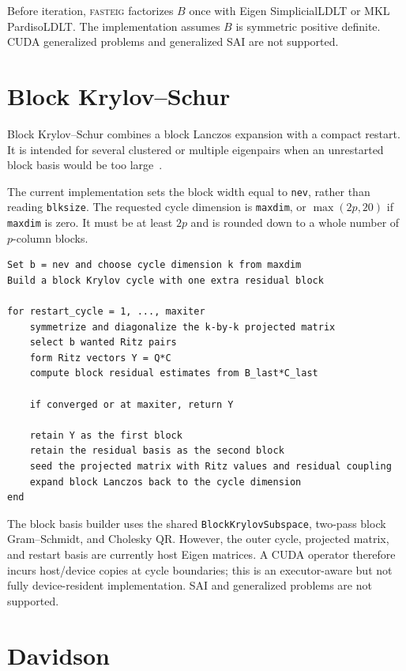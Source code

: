 \documentclass[11pt]{article}
\newcommand{\fasteig}{\textsc{fasteig}}
\newcommand{\code}[1]{\texttt{#1}}
\begin{document}
Before iteration, \fasteig{} factorizes $B$ once with Eigen SimplicialLDLT or
MKL PardisoLDLT.  The implementation assumes $B$ is symmetric positive
definite.  CUDA generalized problems and generalized SAI are not supported.

\section{Block Krylov--Schur}
\label{sec:block-krylov-schur}

Block Krylov--Schur combines a block Lanczos expansion with a compact restart.
It is intended for several clustered or multiple eigenpairs when an unrestarted
block basis would be too large~\cite{blockkrylovschur}.

The current implementation sets the block width equal to \code{nev}, rather
than reading \code{blksize}.  The requested cycle dimension is \code{maxdim},
or $\max(2p,20)$ if \code{maxdim} is zero.  It must be at least $2p$ and is
rounded down to a whole number of $p$-column blocks.

\begin{lstlisting}
Set b = nev and choose cycle dimension k from maxdim
Build a block Krylov cycle with one extra residual block

for restart_cycle = 1, ..., maxiter
    symmetrize and diagonalize the k-by-k projected matrix
    select b wanted Ritz pairs
    form Ritz vectors Y = Q*C
    compute block residual estimates from B_last*C_last

    if converged or at maxiter, return Y

    retain Y as the first block
    retain the residual basis as the second block
    seed the projected matrix with Ritz values and residual coupling
    expand block Lanczos back to the cycle dimension
end
\end{lstlisting}

The block basis builder uses the shared \code{BlockKrylovSubspace}, two-pass
block Gram--Schmidt, and Cholesky QR.  However, the outer cycle, projected
matrix, and restart basis are currently host Eigen matrices.  A CUDA operator
therefore incurs host/device copies at cycle boundaries; this is an
executor-aware but not fully device-resident implementation.  SAI and
generalized problems are not supported.

\section{Davidson}
\label{sec:davidson}
\end{document}
